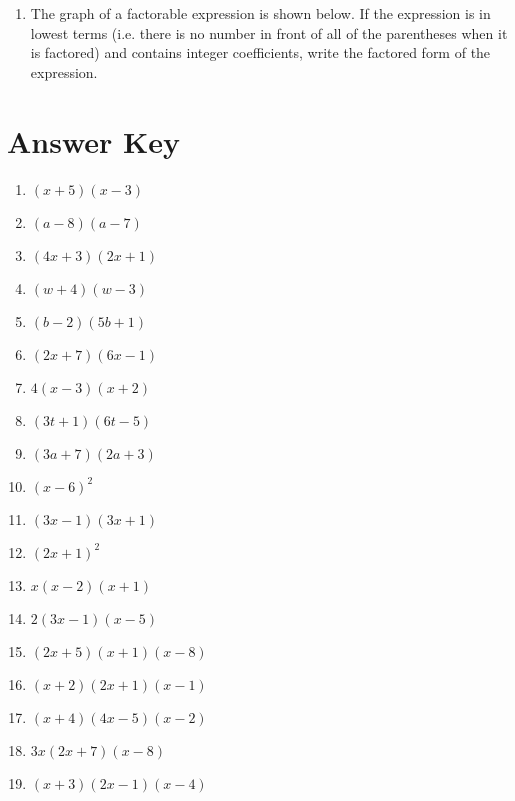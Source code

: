 \begin{enumerate}	\setcounter{enumi}{\value{Review}}
	\item The graph of a factorable expression is shown below. If the expression is in lowest terms (i.e. there is no number in front of all of the parentheses when it is factored) and contains integer coefficients, write the factored form of the expression.   \newline\\

\begin{center}
\end{center}
\end{enumerate}	\setcounter{Review}{\value{enumi}}



\newpage

\section{Answer Key}

\begin{enumerate}
	\item $(x+5)(x-3)$
    \item $(a-8)(a-7)$
    \item $(4x+3)(2x+1)$
    \item $(w+4)(w-3)$
	\item $(b-2)(5b+1)$
    \item $(2x+7)(6x-1)$
    \item $4(x-3)(x+2)$
    \item $(3t+1)(6t-5)$
    \item $(3a+7)(2a+3)$
    \item $(x-6)^2$
    \item $(3x-1)(3x+1)$
    \item $(2x+1)^2$
    \item $x(x-2)(x+1)$
    \item $2(3x-1)(x-5)$
    \item $(2x+5)(x+1)(x-8)$
    \item $(x+2)(2x+1)(x-1)$
    \item $(x+4)(4x-5)(x-2)$
    \item $3x(2x+7)(x-8)$
    
    \item $(x+3)(2x-1)(x-4)$
\end{enumerate}